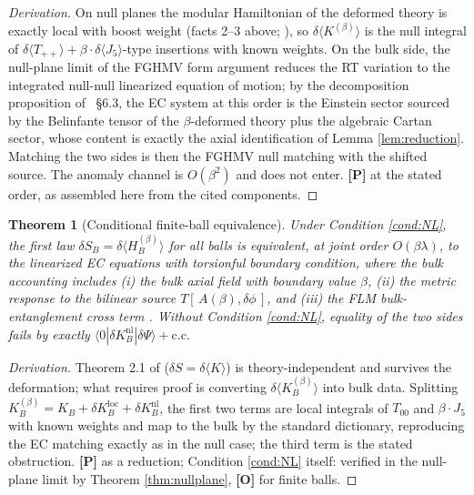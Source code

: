 \documentclass[11pt]{article}
\newtheorem{theorem}{Theorem}[section]
\theoremstyle{definition}
\newcommand{\pP}{\textbf{[P]}}
\newcommand{\pO}{\textbf{[O]}}
\begin{document}
\begin{proof}[Derivation]
On null planes the modular Hamiltonian of the deformed theory is exactly
local with boost weight (facts 2--3 above; \cite{FLPW2016,
CasiniTesteTorroba2017}), so
$\delta\langle K^{(\beta)}\rangle$ is the null integral of
$\delta\langle T_{++}\rangle+\beta\!\cdot\!\delta\langle J_5\rangle$-type
insertions with known weights. On the bulk side, the null-plane limit of
the FGHMV form argument \cite{Faulkner2014} reduces the RT variation to the
integrated null-null linearized equation of motion; by the decomposition
proposition of \cite{McGwier2026}~\S6.3, the EC system at this order is the
Einstein sector sourced by the Belinfante tensor of the $\beta$-deformed
theory plus the algebraic Cartan sector, whose content is exactly the axial
identification of Lemma \ref{lem:reduction}. Matching the two sides is then
the FGHMV null matching with the shifted source. The anomaly channel
\cite{NiehYan1982,ChandiaZanelli1997} is $O(\beta^2)$ and does not enter.
\pP{} at the stated order, as assembled here from the cited components.
\end{proof}

\begin{theorem}[Conditional finite-ball equivalence]
\label{thm:ball}
Under Condition \ref{cond:NL}, the first law
$\delta S_B=\delta\langle H_B^{(\beta)}\rangle$ for all balls is
equivalent, at joint order $O(\beta\lambda)$, to the linearized EC
equations with torsionful boundary condition, where the bulk accounting
includes (i) the bulk axial field with boundary value $\beta$, (ii) the
metric response to the bilinear source $T[\,A(\beta),\delta\phi\,]$, and
(iii) the FLM bulk-entanglement cross term \cite{FLM2013}. Without
Condition \ref{cond:NL}, equality of the two sides fails by exactly
$\langle 0|\delta K_B^{\mathrm{nl}}|\delta\Psi\rangle+\mathrm{c.c.}$
\end{theorem}

\begin{proof}[Derivation]
Theorem 2.1 of \cite{McGwier2026} ($\delta S=\delta\langle K\rangle$) is
theory-independent and survives the deformation; what requires proof is
converting $\delta\langle K_B^{(\beta)}\rangle$ into bulk data. Splitting
$K_B^{(\beta)}=K_B+\delta K_B^{\mathrm{loc}}+\delta K_B^{\mathrm{nl}}$, the
first two terms are local integrals of $T_{00}$ and $\beta\cdot J_5$ with
known weights and map to the bulk by the standard dictionary, reproducing
the EC matching exactly as in the null case; the third term is the stated
obstruction. \pP{} as a reduction; Condition \ref{cond:NL} itself:
verified in the null-plane limit by Theorem \ref{thm:nullplane}, \pO{} for
finite balls.
\end{proof}
\end{document}
